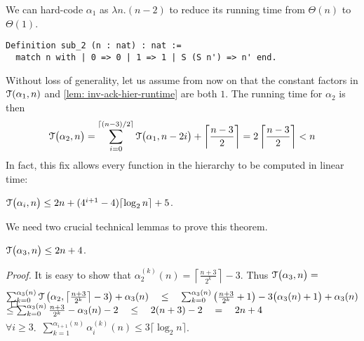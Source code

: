 We can hard-code $\alpha_1$ as $\lambda n.(n-2)$ to reduce its running time
from $\Theta(n)$ to $\Theta(1)$.
\begin{lstlisting}
Definition sub_2 (n : nat) : nat :=
  match n with | 0 => 0 | 1 => 1 | S (S n') => n' end.
\end{lstlisting}
Without loss of generality, let us assume from now on that the constant factors in $\mathcal{T}(\alpha_1, n)$ and \cref{lem: inv-ack-hier-runtime} are both $1$. The running time for $\alpha_2$ is then
\begin{equation*}
\mathcal{T}\big(\alpha_2, n\big)
 = \sum_{i=0}^{\lceil (n-3)/2 \rceil} \mathcal{T} \big(\alpha_1, n-2i\big) + \left\lceil \frac{n-3}{2} \right\rceil =  2\left\lceil \frac{n-3}{2} \right\rceil
 < n
\end{equation*}
In fact, this fix allows every function in the hierarchy to be computed in linear time:
\begin{thm} \label{thm: inv-ack-hier-runtime-improved}
	$\mathcal{T}\big(\alpha_i, n\big) \le 2n + (4^{i+1} - 4)\lceil \log_2n\rceil + 5$.
\end{thm}
We need two crucial technical lemmas to prove this theorem.
\begin{lem} \label{lem: inv-ack-3-runtime}
	$\mathcal{T}\big(\alpha_3, n\big) \le 2n + 4$.
\end{lem}
\begin{proof}
	It is easy to show that $\alpha_2^{(k)}(n) = \left\lceil \frac{n+3}{2^k} \right\rceil - 3$. Thus $\mathcal{T}\big(\alpha_3, n\big) = $
	\begin{equation*}
\begin{array}{@{}l@{}}
	\sum_{k=0}^{\alpha_{3}(n)}\runtime\left(\alpha_2, \left\lceil \frac{n+3}{2^k} \right\rceil - 3\right) + \alpha_{3}(n)  \quad
	\le \quad \sum_{k=0}^{\alpha_3(n)}\left(\frac{n+3}{2^k} + 1\right) - 3\big(\alpha_3(n) + 1\big) + \alpha_3(n) \\
	\le \sum_{k=0}^{\alpha_3(n)}\frac{n+3}{2^k} - \alpha_3(n) - 2 \quad \le \quad 2(n+3) - 2 \quad = \quad 2n + 4 \\
[-3.2em]
\end{array}
	\end{equation*}
\end{proof}
\begin{lem} \label{lem: sum-alpha-repeat}
	$\forall i \ge 3$.~$\displaystyle \sum_{k=1}^{\alpha_{i+1}(n)} \alpha_i^{(k)}(n) \le 3\big\lceil \log_2n \big\rceil$.
\end{lem}
